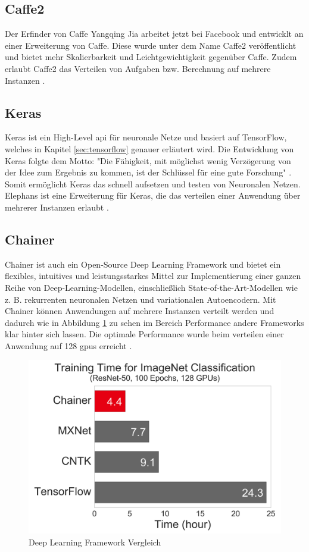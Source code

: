 \subsection{Caffe2}
Der Erfinder von Caffe Yangqing Jia arbeitet jetzt bei Facebook und entwicklt an einer Erweiterung von Caffe. Diese wurde unter dem Name Caffe2 veröffentlicht und bietet mehr Skalierbarkeit und Leichtgewichtigkeit gegenüber Caffe. Zudem erlaubt Caffe2 das Verteilen von Aufgaben bzw. Berechnung auf mehrere Instanzen \cite{Caffe2}.

\subsection{Keras}
Keras ist ein High-Level \ac{api} für neuronale Netze und basiert auf TensorFlow, welches in Kapitel \ref{sec:tensorflow} genauer erläutert wird. Die Entwicklung von Keras folgte dem Motto: "Die Fähigkeit, mit möglichst wenig Verzögerung von der Idee zum Ergebnis zu kommen, ist der Schlüssel für eine gute Forschung" \cite{Keras}. Somit ermöglicht Keras das schnell aufsetzen und testen von Neuronalen Netzen. Elephans ist eine Erweiterung für Keras, die das verteilen einer Anwendung über mehrerer Instanzen erlaubt \cite{Elephas}.

\subsection{Chainer}
Chainer ist auch ein Open-Source Deep Learning Framework und bietet ein flexibles, intuitives und leistungsstarkes Mittel zur Implementierung einer ganzen Reihe von Deep-Learning-Modellen, einschließlich State-of-the-Art-Modellen wie z. B. rekurrenten neuronalen Netzen und variationalen Autoencodern. Mit Chainer können Anwendungen auf mehrere Instanzen verteilt werden und dadurch wie in Abbildung \ref{fig:chainercomparisson} zu sehen im Bereich Performance andere Frameworks klar hinter sich lassen. Die optimale Performance wurde beim verteilen einer Anwendung auf 128 \ac{gpu}s erreicht \cite{Chainer}.

\begin{figure}[h!]
	\centering
	\includegraphics[width=0.9\linewidth]{Pictures/Chainer_Comparisson}
	\caption[Deep Learning Framework Vergleich]{Deep Learning Framework Vergleich \cite{Chainer}}
	\label{fig:chainercomparisson}
\end{figure}

